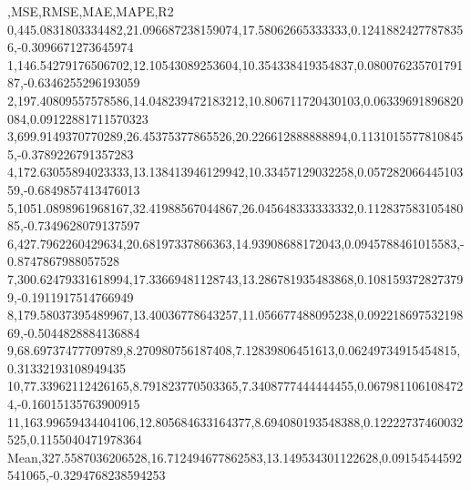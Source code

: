 ,MSE,RMSE,MAE,MAPE,R2
0,445.0831803334482,21.096687238159074,17.58062665333333,0.12418824277878356,-0.3096671273645974
1,146.54279176506702,12.10543089253604,10.354338419354837,0.08007623570179187,-0.6346255296193059
2,197.40809557578586,14.048239472183212,10.806711720430103,0.06339691896820084,0.09122881711570323
3,699.9149370770289,26.45375377865526,20.226612888888894,0.11310155778108455,-0.3789226791357283
4,172.63055894023333,13.138413946129942,10.33457129032258,0.05728206644510359,-0.6849857413476013
5,1051.0898961968167,32.41988567044867,26.045648333333332,0.11283758310548085,-0.7349628079137597
6,427.7962260429634,20.68197337866363,14.93908688172043,0.0945788461015583,-0.8747867988057528
7,300.62479331618994,17.33669481128743,13.286781935483868,0.1081593728273799,-0.1911917514766949
8,179.58037395489967,13.40036778643257,11.056677488095238,0.09221869753219869,-0.5044828884136884
9,68.69737477709789,8.270980756187408,7.12839806451613,0.06249734915454815,0.31332193108949435
10,77.33962112426165,8.791823770503365,7.3408777444444455,0.0679811061084724,-0.16015135763900915
11,163.99659434404106,12.805684633164377,8.694080193548388,0.12222737460032525,0.1155040471978364
Mean,327.5587036206528,16.712494677862583,13.149534301122628,0.09154544592541065,-0.3294768238594253
